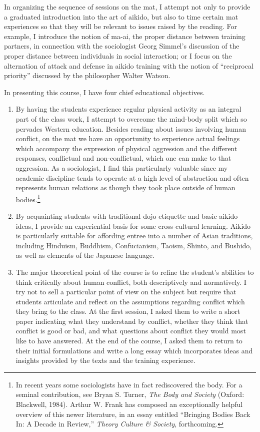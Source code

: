 In organizing the sequence of sessions on the mat, I attempt not only to provide a graduated introduction into the art of aikido, but also to time certain mat experiences so that they will be relevant to issues raised by the reading. For example, I introduce the notion of ma-ai, the proper distance between training partners, in connection with the sociologist Georg Simmel's discussion of the proper distance between individuals in social interaction; or I focus on the alternation of attack and defense in aikido training with the notion of ``reciprocal priority'' discussed by the philosopher Walter Watson. 

In presenting this course, I have four chief educational objectives.

\begin{enumerate}
\item By having the students experience regular physical activity as an integral part of the class work, I attempt to overcome the mind-body split which so pervades Western education. Besides reading about issues involving human conflict, on the mat we have an opportunity to experience actual feelings which accompany the expression of physical aggression and the different responses, conflictual and non-conflictual, which one can make to that aggression. As a sociologist, I find this particularly valuable since my academic discipline tends to operate at a high level of abstraction and often represents human relations as though they took place outside of human bodies.\footnote{In recent years some sociologists have in fact rediscovered the body. For a seminal contribution, see Bryan S. Turner, \emph{The Body and Society} (Oxford: Blackwell, 1984). Arthur W. Frank has composed an exceptionally helpful overview of this newer literature, in an essay entitled ``Bringing Bodies Back In: A Decade in Review,'' \emph{Theory Culture \& Society}, forthcoming.}
\item By acquainting students with traditional dojo etiquette and basic aikido ideas, I provide an experiential basis for some cross-cultural learning. Aikido is particularly suitable for affording entree into a number of Asian traditions, including Hinduism, Buddhism, Confucianism, Taoism, Shinto, and Bushido, as well as elements of the Japanese language.
\item The major theoretical point of the course is to refine the student's abilities to think critically about human conflict, both descriptively and normatively. I try not to sell a particular point of view on the subject but require that students articulate and reflect on the assumptions regarding conflict which they bring to the class. At the first session, I asked them to write a short paper indicating what they understand by conflict, whether they think that conflict is good or bad, and what questions about conflict they would most like to have answered. At the end of the course, I asked them to return to their initial formulations and write a long essay which incorporates ideas and insights provided by the texts and the training experience. 

\end{enumerate}
